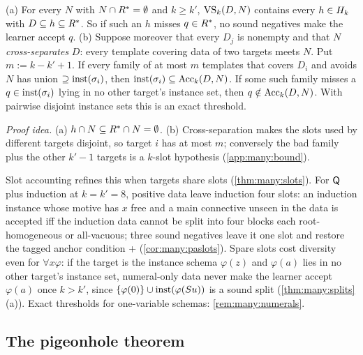 \begin{theorem}\label{thm:many:splits}
(a) For every $N$ with $N\cap R^{*}=\emptyset$ and $k\ge k'$, $\mathrm{VS}_k(D,N)$ contains every $h\in H_{k}$ with
$D\subseteq h\subseteq R^{*}$. So if such an $h$ misses $q\in R^{*}$, no sound negatives make the learner accept $q$.
(b) Suppose moreover that every $D_j$ is nonempty and that $N$ \emph{cross-separates} $D$: every template covering data of
two targets meets $N$. Put $m:=k-k'+1$. If every family of at most $m$ templates that covers $D_i$ and avoids $N$ has union
$\supseteq\mathrm{inst}(\sigma_i)$, then $\mathrm{inst}(\sigma_i)\subseteq\mathrm{Acc}_k(D,N)$. If some such family misses a $q\in\mathrm{inst}(\sigma_i)$
lying in no other target's instance set, then $q\notin\mathrm{Acc}_k(D,N)$. With pairwise disjoint instance sets this is an exact
threshold.
\end{theorem}
\noindent\emph{Proof idea.} (a) $h\cap N\subseteq R^{*}\cap N=\emptyset$. (b) Cross-separation makes the slots used by
different targets disjoint, so target $i$ has at most $m$; conversely the bad family plus the other $k'-1$ targets is a
$k$-slot hypothesis (\cref{app:many:bound}).\medskip

Slot accounting refines this when targets share slots (\cref{thm:many:slots}). For $\mathsf{Q}$ plus induction at $k=k'=8$,
positive data leave induction four slots: an induction instance whose motive has $x$ free and a main connective unseen in
the data is accepted iff the induction data cannot be split into four blocks each root-homogeneous or all-vacuous; three
sound negatives leave it one slot and restore the tagged anchor condition \evR{}+\evN{} (\cref{cor:many:paslots}). Spare
slots cost diversity even for $\forall x\varphi$: if the target is the instance schema $\varphi(z)$ and $\varphi(a)$ lies in
no other target's instance set, numeral-only data never make the learner accept $\varphi(a)$ once $k>k'$, since
$\{\varphi(0)\}\cup\mathrm{inst}(\varphi(Su))$ is a sound split (\cref{thm:many:splits}(a)). Exact thresholds for one-variable schemas:
\cref{rem:many:numerals}.

\subsection{The pigeonhole theorem}\label{sec:many:pigeon}


